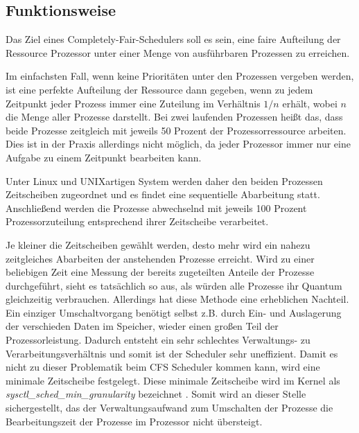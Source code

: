 \subsection{Funktionsweise}\label{s:cfs_fktweise}


Das Ziel eines  Completely-Fair-Schedulers{} soll es sein, eine faire Aufteilung der Ressource Prozessor unter einer Menge von ausführbaren Prozessen zu erreichen.


Im einfachsten Fall, wenn keine Prioritäten unter den Prozessen vergeben werden, ist eine perfekte Aufteilung der Ressource dann gegeben, wenn zu jedem Zeitpunkt jeder Prozess immer eine Zuteilung im Verhältnis $1/n$ erhält, wobei $n$ die Menge aller Prozesse darstellt.
Bei zwei laufenden Prozessen heißt das, dass beide Prozesse zeitgleich mit jeweils 50 Prozent der Prozessorressource arbeiten. Dies ist in der Praxis allerdings nicht möglich, da jeder Prozessor immer nur eine Aufgabe zu einem Zeitpunkt bearbeiten kann.

Unter Linux und UNIXartigen System werden daher den beiden Prozessen Zeitscheiben zugeordnet und es findet eine sequentielle Abarbeitung statt. Anschließend werden die Prozesse abwechselnd mit jeweils 100 Prozent Prozessorzuteilung entsprechend ihrer Zeitscheibe verarbeitet.

Je kleiner die Zeitscheiben gewählt werden, desto mehr wird ein nahezu zeitgleiches Abarbeiten der anstehenden Prozesse erreicht.
Wird zu einer beliebigen Zeit eine Messung der bereits zugeteilten Anteile der Prozesse durchgeführt, sieht es tatsächlich so aus, als wür\-den alle Prozesse ihr Quantum gleichzeitig verbrauchen.
Allerdings hat diese Methode eine erheblichen Nachteil. Ein einziger Umschalt\-vorgang be\-nötigt selbst z.B. durch Ein- und Auslagerung der verschieden Daten im Speicher, wieder einen großen Teil der Prozessorleistung. Dadurch entsteht ein sehr schlechtes Verwaltungs- zu Verarbeitungs\-verhält\-nis und somit ist der Scheduler sehr uneffizient. Damit es nicht zu dieser Problematik beim CFS Scheduler kommen kann, wird eine minimale Zeitscheibe festgelegt. Diese minimale Zeitscheibe wird im Kernel als \textit{sysctl\_sched\_min\_granu\-larity} bezeichnet \cite{paperfairness}.
Somit wird an dieser Stelle sichergestellt, das der Verwaltungsaufwand zum Umschalten der Prozesse die Bearbeitungszeit der Prozesse im Prozessor nicht übersteigt.


